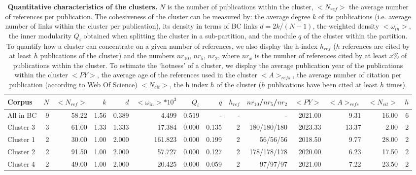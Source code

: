 \documentclass[a4paper,11pt]{report}
\begin{document}
\begin{landscape}
\begin{table}[ht]
\caption*{{\bf Quantitative characteristics of the clusters.} $N$ is the number of publications within the cluster, $<N_{ref}>$ the average number of references per publication. The cohesiveness of the cluster can be measured by: the average degree $k$ of its publications (i.e. average number of links within the cluster per publication), its density in terms of BC links $d=2k/(N-1)$, the weighted density $<\omega_{in}>$, the inner modularity $Q_i$ obtained when splitting the cluster in a sub-partition, and the module $q$ of the cluster within the partition. To quantify how a cluster can concentrate on a given number of references, we also display the h-index $h_{ref}$ ($h$ references are cited by at least $h$ publications of the cluster) and the numbers $nr_{10}$, $nr_{5}$, $nr_{2}$, where $nr_{x}$ is the number of references cited by at least $x\%$ of publications within the cluster. To estimate the `hotness' of a cluster, we display the average publication year of the publications within the cluster $<PY>$, the average age of the references used in the cluster $<A>_{refs}$, the average number of citation per publication (according to Web Of Science) $<N_{cit}>$, the h index $h$ of the cluster ($h$ publications have been cited at least $h$ times).}
\begin{center}
{
\footnotesize\begin{tabular}{|l |r r| r r r r r r r|r r r r|}
\hline
Corpus & $N$ & $<N_{ref}>$ & $k$ & $d$ & $<\omega_{in}>*10^3$ & $Q_i$ & $q$ & $h_{ref}$ & $nr_{10}$/$nr_{5}$/$nr_{2}$ & $<PY>$ & $<A>_{refs}$ & $<N_{cit}>$ & $h$ \\
\hline
All in BC & 9 & 58.22 & 1.56 & 0.389 & 4.499 & 0.519 & - & - & - & 2021.00 & 9.31 & 16.00 & 6\\
\hline
Cluster 3  & 3 & 61.00 & 1.33 & 1.333 & 17.384 & 0.000 & 0.135 & 2 & 180/180/180 & 2023.33 & 13.37 & 2.00 & 2\\
Cluster 1  & 2 & 30.00 & 1.00 & 2.000 & 161.823 & 0.000 & 0.199 & 2 & 56/56/56 & 2018.50 & 9.77 & 28.00 & 2\\
Cluster 2  & 2 & 91.50 & 1.00 & 2.000 & 57.727 & 0.000 & 0.127 & 2 & 178/178/178 & 2020.00 & 6.23 & 17.50 & 2\\
Cluster 4  & 2 & 49.00 & 1.00 & 2.000 & 20.425 & 0.000 & 0.059 & 2 & 97/97/97 & 2021.00 & 7.22 & 23.50 & 2\\
\hline
\end{tabular}}
\end{center}
\end{table}\clearpage


\end{landscape}
\end{document}
